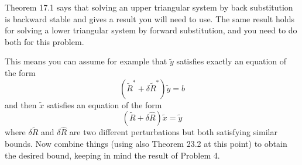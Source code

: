\documentclass[10pt]{article}
\begin{document}
Theorem 17.1 says that solving an upper triangular system by back substitution
is backward stable and gives a result you will need to use.
The same result holds for solving a lower triangular system by forward
substitution, and you need to do both for this problem.  

This means you can assume
for example that $\tilde y$ satisfies exactly an equation of the form
\[
(\tilde R^* + \delta \tilde R^*)\tilde y = b
\]
and then $\tilde x$ satisfies an equation of the form
\[
(\tilde R + \delta \hat R)\tilde x = \tilde y
\]
where $\delta \tilde R$ and $\delta \hat R$ 
are two different perturbations but both satisfying
similar bounds.  Now combine things (using also Theorem 23.2 at this point)
to obtain the desired bound, keeping in mind the result of Problem 4.



\end{document}
